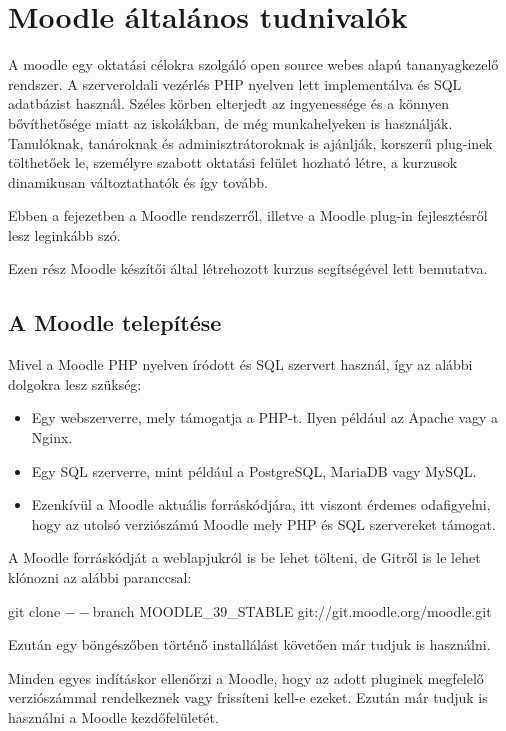 \chapter{Moodle általános tudnivalók}

A moodle egy oktatási célokra szolgáló open source webes alapú tananyagkezelő rendszer. A szerveroldali vezérlés PHP nyelven lett implementálva és SQL adatbázist használ. Széles körben elterjedt az ingyenessége és a könnyen bővíthetősége miatt az iskolákban, de még munkahelyeken is használják. Tanulóknak, tanároknak és adminisztrátoroknak is ajánlják, korszerű plug-inek tölthetőek le, személyre szabott oktatási felület hozható létre, a kurzusok dinamikusan változtathatók és így tovább. \par
Ebben a fejezetben a Moodle rendszerről, illetve a Moodle plug-in fejlesztésről lesz leginkább szó. \par
Ezen rész \cite{MoodleDev} Moodle készítői által létrehozott kurzus segítségével lett bemutatva.

\section{A Moodle telepítése}

Mivel a Moodle PHP nyelven íródott és SQL szervert használ, így az alábbi dolgokra lesz szükség:
\begin{itemize}
    \item Egy webszerverre, mely támogatja a PHP-t. Ilyen például az Apache vagy a Nginx.
    \item Egy SQL szerverre, mint például a PostgreSQL, MariaDB vagy MySQL.
    \item Ezenkívül a Moodle aktuális forráskódjára, itt viszont érdemes odafigyelni, hogy az utolsó verziószámú Moodle mely PHP és SQL szervereket támogat.
\end{itemize}

A Moodle forráskódját a weblapjukról is be lehet tölteni, de Gitről is le lehet klónozni az alábbi paranccsal:

\begin{center}
git clone $--$branch MOODLE\_39\_STABLE git://git.moodle.org/moodle.git
\end{center}

Ezután egy böngészőben történő installálást követően már tudjuk is használni.\par
Minden egyes indításkor ellenőrzi a Moodle, hogy az adott pluginek megfelelő verziószámmal rendelkeznek vagy frissíteni kell-e ezeket. Ezután már tudjuk is használni a Moodle kezdőfelületét.

